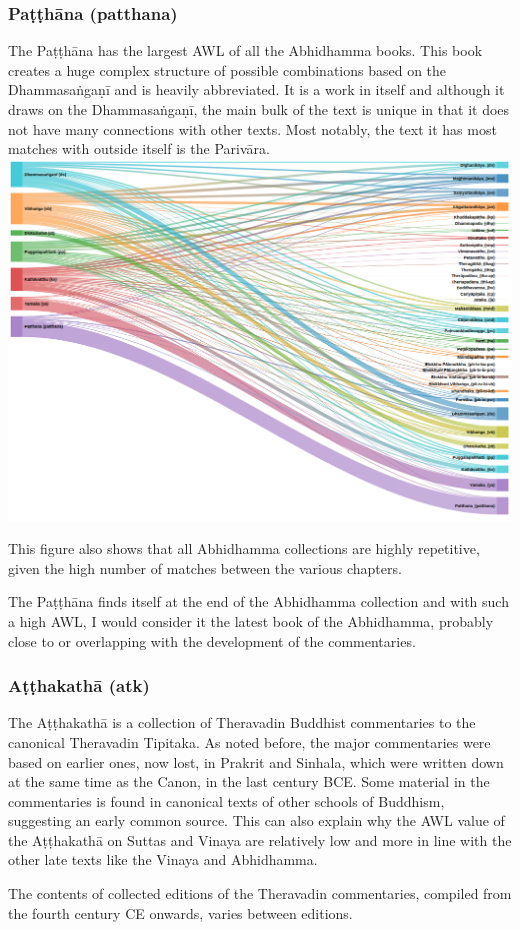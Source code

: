 \subsubsection{Paṭṭhāna (patthana)}
The Paṭṭhāna has the largest AWL of all the Abhidhamma books. This book creates a huge complex structure of possible combinations based on the Dhammasaṅgaṇī and is heavily abbreviated. It is a work in itself and although it draws on the Dhammasaṅgaṇī, the main bulk of the text is unique in that it does not have many connections with other texts. Most notably, the text it has most matches with outside itself is the Parivāra.\\

\includegraphics[width=\linewidth]{abhidhamma.png}
\label{abhidhamma}

\medskip
This figure also shows that all Abhidhamma collections are highly repetitive, given the high number of matches between the various chapters.

The Paṭṭhāna finds itself at the end of the Abhidhamma collection and with such a high AWL, I would consider it the latest book of the Abhidhamma, probably close to or overlapping with the development of the commentaries.

\subsubsection{Aṭṭhakathā (atk)}
The Aṭṭhakathā is a collection of Theravadin Buddhist commentaries to the canonical Theravadin Tipitaka. As noted before, the major commentaries were based on earlier ones, now lost, in Prakrit and Sinhala, which were written down at the same time as the Canon, in the last century BCE. Some material in the commentaries is found in canonical texts of other schools of Buddhism, suggesting an early common source. This can also explain why the AWL value of the Aṭṭhakathā on Suttas and Vinaya are relatively low and more in line with the other late texts like the Vinaya and Abhidhamma.

The contents of collected editions of the Theravadin commentaries, compiled from the fourth century CE onwards, varies between editions. 